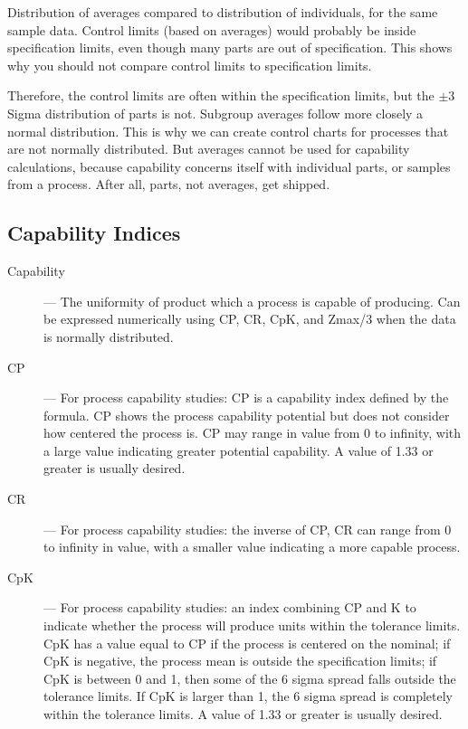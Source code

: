 \documentclass[SPC-MASTER.tex]{subfiles}
\begin{document}
Distribution of averages compared to distribution of individuals, for the same sample data. Control limits (based on averages) would probably be inside specification limits, even though many parts are out of specification. This shows why you should not compare control limits to specification limits.

Therefore, the control limits are often within the specification limits, but the $\pm 3$ Sigma distribution of parts is not.  Subgroup averages follow more closely a normal distribution. This is why we can create control charts for processes that are not normally distributed. But averages cannot be used for capability calculations, because capability concerns itself with individual parts, or samples from a process. After all, parts, not averages, get shipped.
\newpage
\subsection{Capability Indices}

\begin{description}
\item[Capability] — The uniformity of product which a process is capable of producing. Can be expressed numerically using CP, CR, CpK, and Zmax/3 when the data is normally distributed.

\item[CP] — For process capability studies: CP is a capability index defined by the formula. CP shows the process capability potential but does not consider how centered the process is. CP may range in value from 0 to infinity, with a large value indicating greater potential capability. A value of 1.33 or greater is usually desired.

\item[CR] — For process capability studies: the inverse of CP, CR can range from 0 to infinity in value, with a smaller value indicating a more capable process.

\item[CpK] — For process capability studies: an index combining CP and K to indicate whether the process will produce units within the tolerance limits. CpK has a value equal to CP if the process is centered on the nominal; if CpK is negative, the process mean is outside the specification limits; if CpK is between 0 and 1, then some of the 6 sigma spread falls outside the tolerance limits. If CpK is larger than 1, the 6 sigma spread is completely within the tolerance limits. A value of 1.33 or greater is usually desired.
\end{description}
\newpage
\end{document}
